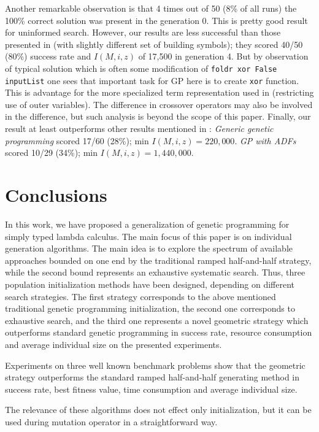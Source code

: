 \documentclass[conference]{IEEEtran}
\newcommand{\red}[1]{{\color{red} #1}}
\begin{document}
Another remarkable observation is that 4 times out of 50 (8\% of all runs) 
the 100\% correct solution was present in the generation 0. This is pretty good
result for uninformed search. However, our results are less successful 
than those presented in \cite{yu01} (with slightly different set of 
building symbols); they scored 40/50 (80\%) success rate and $I(M,i,z)$ of 
17,500 in generation 4. But by observation of typical solution which is often
some modification of \texttt{foldr xor False inputList} one sees that important 
task for GP here is to create \texttt{xor} function. This is advantage for the 
more specialized term representation used in \cite{yu01} 
(restricting use of outer variables). 
The difference in crossover operators may also be involved in the difference, 
but such analysis is beyond the scope of this paper. Finally, our result at least outperforms other results mentioned in \cite{yu01}: \textit{Generic genetic programming} 
scored 17/60 (28\%); min $I(M,i,z) = 220,000$. \textit{GP with ADFs} 
scored 10/29 (34\%); min $I(M,i,z) = 1,440,000$.

\section{Conclusions}
\label{conclusions}

In this work, we have proposed a generalization of genetic programming 
for simply typed lambda calculus. The main focus of this paper is on individual generation algorithms. 
The main idea is to explore the spectrum of available approaches bounded on one end by the traditional
ramped half-and-half strategy, while the second bound represents an exhaustive systematic search. 
Thus, three population initialization methods have been designed, 
depending on different search strategies. 
The first strategy corresponds to the above mentioned traditional genetic programming initialization,  
the second one corresponds to exhaustive search, and the third one 
represents a novel geometric strategy which outperforms standard genetic 
programming in success rate, resource consumption and average individual size 
on the presented experiments. 


Experiments on three well 
known benchmark problems show
that the geometric strategy outperforms
the standard ramped half-and-half 
generating method in success rate, best fitness value,
time consumption and average individual size.

The relevance of these algorithms does not effect only initialization, but it can be used during mutation
operator in a straightforward way. 
\end{document}
